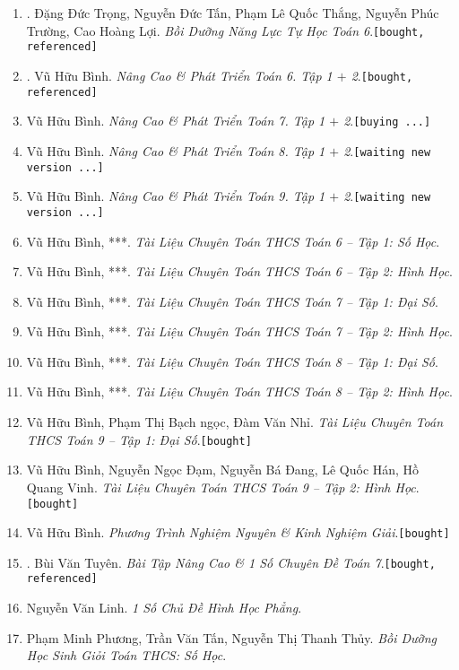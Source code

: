 \documentclass{article}
\numberwithin{equation}{section}
\begin{document}
\begin{enumerate}
	\item \cite{Trong_Toan_6_2021}. Đặng Đức Trọng, Nguyễn Đức Tấn, Phạm Lê Quốc Thắng, Nguyễn Phúc Trường, Cao Hoàng Lợi. \textit{Bồi Dưỡng Năng Lực Tự Học Toán 6}.\hfill\texttt{[bought, referenced]}
	\item \cite{Binh_Toan_6_tap_1, Binh_Toan_6_tap_2}. Vũ Hữu Bình. \textit{Nâng Cao \& Phát Triển Toán 6. Tập 1 $+$ 2}.\hfill\texttt{[bought, referenced]}
	\item Vũ Hữu Bình. \textit{Nâng Cao \& Phát Triển Toán 7. Tập 1 $+$ 2}.\hfill\texttt{[buying ...]}
	\item Vũ Hữu Bình. \textit{Nâng Cao \& Phát Triển Toán 8. Tập 1 $+$ 2}.\hfill\texttt{[waiting new version ...]}
	\item Vũ Hữu Bình. \textit{Nâng Cao \& Phát Triển Toán 9. Tập 1 $+$ 2}.\hfill\texttt{[waiting new version ...]}
	\item Vũ Hữu Bình, ***. \textit{Tài Liệu Chuyên Toán THCS Toán 6 -- Tập 1: Số Học}.
	\item Vũ Hữu Bình, ***. \textit{Tài Liệu Chuyên Toán THCS Toán 6 -- Tập 2: Hình Học}.	
	\item Vũ Hữu Bình, ***. \textit{Tài Liệu Chuyên Toán THCS Toán 7 -- Tập 1: Đại Số}.
	\item Vũ Hữu Bình, ***. \textit{Tài Liệu Chuyên Toán THCS Toán 7 -- Tập 2: Hình Học}.
	\item Vũ Hữu Bình, ***. \textit{Tài Liệu Chuyên Toán THCS Toán 8 -- Tập 1: Đại Số}.
	\item Vũ Hữu Bình, ***. \textit{Tài Liệu Chuyên Toán THCS Toán 8 -- Tập 2: Hình Học}.
	\item Vũ Hữu Bình, Phạm Thị Bạch ngọc, Đàm Văn Nhỉ. \textit{Tài Liệu Chuyên Toán THCS Toán 9 -- Tập 1: Đại Số}.\hfill\texttt{[bought]}
	\item Vũ Hữu Bình, Nguyễn Ngọc Đạm, Nguyễn Bá Đang, Lê Quốc Hán, Hồ Quang Vinh. \textit{Tài Liệu Chuyên Toán THCS Toán 9 -- Tập 2: Hình Học}.\hfill\texttt{[bought]}
	\item Vũ Hữu Bình. \textit{Phương Trình Nghiệm Nguyên \& Kinh Nghiệm Giải}.\hfill\texttt{[bought]}
	\item \cite{Tuyen2022}. Bùi Văn Tuyên. \textit{Bài Tập Nâng Cao \& 1 Số Chuyên Đề Toán 7}.\hfill\texttt{[bought, referenced]}
	\item Nguyễn Văn Linh. \textit{1 Số Chủ Đề Hình Học Phẳng}.
	\item Phạm Minh Phương, Trần Văn Tấn, Nguyễn Thị Thanh Thủy. \textit{Bồi Dưỡng Học Sinh Giỏi Toán THCS: Số Học}.

\end{enumerate}
\end{document}
